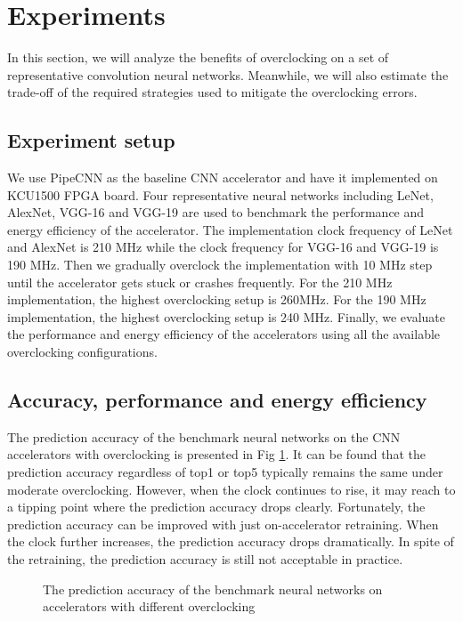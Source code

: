 \section{Experiments}
In this section, we will analyze the benefits of 
overclocking on a set of representative convolution neural networks.
Meanwhile, we will also estimate the trade-off of the required strategies 
used to mitigate the overclocking errors.

\subsection{Experiment setup}
We use PipeCNN as the baseline CNN accelerator and have it implemented on KCU1500 FPGA board.
Four representative neural networks including LeNet, AlexNet, VGG-16 and VGG-19 are used to 
benchmark the performance and energy efficiency of the accelerator. The implementation clock
frequency of LeNet and AlexNet is 210 MHz while the clock frequency for VGG-16 and VGG-19 is 190 MHz.
Then we gradually overclock the implementation with 10 MHz step until the accelerator gets 
stuck or crashes frequently. For the 210 MHz implementation, the highest overclocking setup is 
260MHz. For the 190 MHz implementation, the highest overclocking setup is 240 MHz.
Finally, we evaluate the performance and energy efficiency of the accelerators using 
all the available overclocking configurations.

\subsection{Accuracy, performance and energy efficiency}
The prediction accuracy of the benchmark neural networks on the CNN accelerators with overclocking is 
presented in Fig \ref{fig:overclock-accuracy}. It can be found that the prediction accuracy 
regardless of top1 or top5 typically remains the same under moderate overclocking. However, when the clock 
continues to rise, it may reach to a tipping point where the prediction accuracy drops clearly. 
Fortunately, the prediction accuracy can be improved with just on-accelerator retraining.
When the clock further increases, the prediction accuracy drops dramatically. In spite of the retraining, 
the prediction accuracy is still not acceptable in practice. 
\begin{figure}
        \center
	\qquad
	\qquad
        \qquad
	\caption{The prediction accuracy of the benchmark neural networks on accelerators with different overclocking}
        \label{fig:overclock-accuracy}
\end{figure}

